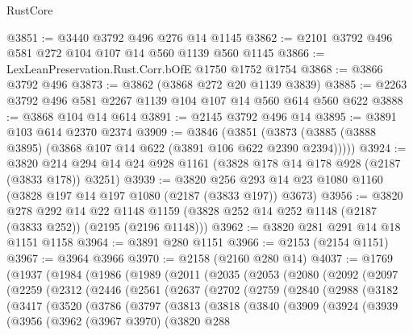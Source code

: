 \begin{lexlean}{RustCore}
\begin{coremodule}
@3851 := @3440 @3792 @496 @276 @14 @1145
@3862 := @2101 @3792 @496 @581 @272 @104 @107 @14 @560 @1139 @560 @1145
@3866 := LexLeanPreservation.Rust.Corr.bOfE @1750 @1752 @1754
@3868 := @3866 @3792 @496
@3873 := @3862 (@3868 @272 @20 @1139 @3839)
@3885 := @2263 @3792 @496 @581 @2267 @1139 @104 @107 @14 @560 @614 @560 @622
@3888 := @3868 @104 @14 @614
@3891 := @2145 @3792 @496 @14
@3895 := @3891 @103 @614 @2370 @2374
@3909 := @3846
    (@3851 (@3873 (@3885 (@3888 @3895) (@3868 @107 @14 @622 (@3891 @106 @622 @2390 @2394)))))
@3924 := @3820 @214 @294 @14 @24 @928 @1161 (@3828 @178 @14 @178 @928 (@2187 (@3833 @178)) @3251)
@3939 := @3820 @256 @293 @14 @23 @1080 @1160 (@3828 @197 @14 @197 @1080 (@2187 (@3833 @197)) @3673)
@3956 := @3820
    @278
    @292
    @14
    @22
    @1148
    @1159
    (@3828 @252 @14 @252 @1148 (@2187 (@3833 @252)) (@2195 (@2196 @1148)))
@3962 := @3820 @281 @291 @14 @18 @1151 @1158
@3964 := @3891 @280 @1151
@3966 := @2153 (@2154 @1151)
@3967 := @3964 @3966
@3970 := @2158 (@2160 @280 @14)
@4037 := @1769
    (@1937
      (@1984
        (@1986
          (@1989
            (@2011
              (@2035
                (@2053
                  (@2080
                    (@2092
                      (@2097
                        (@2259
                          (@2312
                            (@2446
                              (@2561
                                (@2637
                                  (@2702
                                    (@2759
                                      (@2840
                                        (@2988
                                          (@3182
                                            (@3417
                                              (@3520
                                                (@3786
                                                  (@3797
                                                    (@3813
                                                      (@3818
                                                        (@3840
                                                          (@3909
                                                            (@3924
                                                              (@3939
                                                                (@3956
                                                                  (@3962
                                                                    (@3967 @3970)
                                                                    (@3820
                                                                      @288

\end{coremodule}
\end{lexlean}

